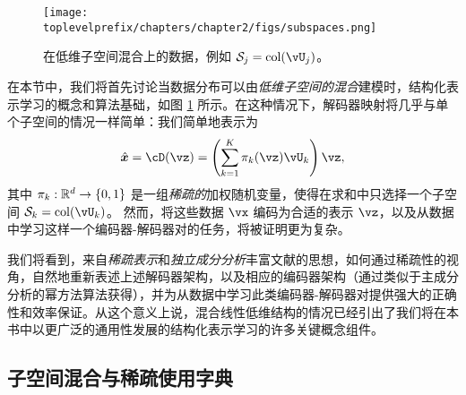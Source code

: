 \documentclass[../../book-main_zh.tex]{subfiles}
\begin{document}
\begin{figure}
    \centering
    \texttt{[image: \\toplevelprefix/chapters/chapter2/figs/subspaces.png]}
    \caption{在低维子空间混合上的数据，例如 $\mathcal{S}_j = \mathop{\mathrm{col}}(\vU_j)$。}
    \label{fig:subspaces}
\end{figure}

在本节中，我们将首先讨论当数据分布可以由\textit{低维子空间的混合}建模时，结构化表示学习的概念和算法基础，如图 \ref{fig:subspaces} 所示。在这种情况下，解码器映射将几乎与单个子空间的情况一样简单：我们简单地表示为
\begin{equation}\label{eq:mixture-subspaces-decoder-first-cut}
    \hat{\x} = \cD(\vz) = \left( \sum_{k=1}^K \pi_k(\vz)\vU_k \right) \vz,
\end{equation}
其中 $\pi_k : \R^d \to \set{0,1}$ 是一组\textit{稀疏的}加权随机变量，使得在求和中只选择一个子空间 $\mathcal{S}_k = \mathop{\mathrm{col}}(\vU_k)$。
然而，将这些数据 $\vx$ 编码为合适的表示 $\vz$，以及从数据中学习这样一个编码器-解码器对的任务，将被证明更为复杂。

我们将看到，来自\textit{稀疏表示}和\textit{独立成分分析}丰富文献的思想，如何通过稀疏性的视角，自然地重新表述上述解码器架构，以及相应的编码器架构（通过类似于主成分分析的幂方法算法获得），并为从数据中学习此类编码器-解码器对提供强大的正确性和效率保证。从这个意义上说，混合线性低维结构的情况已经引出了我们将在本书中以更广泛的通用性发展的结构化表示学习的许多关键概念组件。


\subsection{子空间混合与稀疏使用字典}\label{sec:mixture-and-dict}

\end{document}
